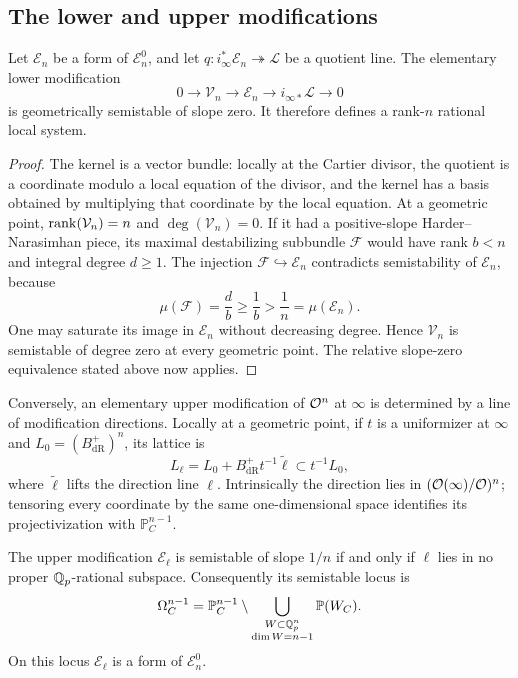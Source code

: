 \subsection{The lower and upper modifications}

\begin{lemma}\label{lem:lower-modification}
Let $\mathcal E_n$ be a form of $\mathcal E_n^0$, and let
$q:i_\infty^*\mathcal E_n\twoheadrightarrow\mathcal L$ be a quotient
line.  The elementary lower modification
\[
 0\longrightarrow\mathcal V_n\longrightarrow\mathcal E_n
 \longrightarrow i_{\infty *}\mathcal L\longrightarrow0
\]
is geometrically semistable of slope zero.  It therefore defines a
rank-$n$ rational local system.
\end{lemma}

\begin{proof}
The kernel is a vector bundle: locally at the Cartier divisor, the
quotient is a coordinate modulo a local equation of the divisor, and
the kernel has a basis obtained by multiplying that coordinate by the
local equation.  At a geometric point,
$\operatorname{rank}(\mathcal V_n)=n$ and $\deg(\mathcal V_n)=0$.
If it had a positive-slope Harder--Narasimhan piece, its maximal
destabilizing subbundle $\mathcal F$ would have rank $b<n$ and integral
degree $d\geq1$.  The injection $\mathcal F\hookrightarrow\mathcal E_n$
contradicts semistability of $\mathcal E_n$, because
\[
 \mu(\mathcal F)=\frac d b\geq\frac1b>\frac1n
       =\mu(\mathcal E_n).
\]
One may saturate its image in $\mathcal E_n$ without decreasing degree.
Hence $\mathcal V_n$ is semistable of degree zero at every geometric
point.  The relative slope-zero equivalence stated above now applies.
\end{proof}

Conversely, an elementary upper modification of $\mathcal O^n$ at $\infty$
is determined by a line of modification directions.  Locally at a
geometric point, if $t$ is a uniformizer at $\infty$ and
$L_0=(B_{\mathrm{dR}}^+)^n$, its lattice is
\[
 L_\ell=L_0+B_{\mathrm{dR}}^+t^{-1}\widetilde\ell
       \subset t^{-1}L_0 ,
\]
where $\widetilde\ell$ lifts the direction line $\ell$.
Intrinsically the direction lies in
$(\mathcal O(\infty)/\mathcal O)^n$; tensoring every coordinate by the same
one-dimensional space identifies its projectivization with
$\mathbb P^{n-1}_C$.

\begin{lemma}\label{lem:drinfeld-locus}
The upper modification $\mathcal E_\ell$ is semistable of slope $1/n$
if and only if $\ell$ lies in no proper $\mathbb Q_p$-rational subspace.
Consequently its semistable locus is
\[
 \Omega_C^{n-1}
 =\mathbb P_C^{n-1}\setminus
       \bigcup_{\substack{W\subset\mathbb Q_p^n\\ \dim W=n-1}}\mathbb P(W_C).
\]
On this locus $\mathcal E_\ell$ is a form of $\mathcal E_n^0$.
\end{lemma}

